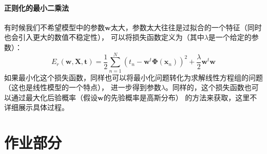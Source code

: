 \documentclass[a4paper,zihao=5,UTF8]{ctexart}
\newcommand{\mb}[1]{\mathbf{#1}}
\begin{document}
    \paragraph{正则化的最小二乘法}
    有时候我们不希望模型中的参数$\mb{w}$太大，参数太大往往是过拟合的一个特征（同时也会引入更大的数值不稳定性），
    可以将损失函数定义为（其中$\lambda$是一个给定的参数）：
    \begin{equation}
        E_r(\mb{w}, \mb{X}, \mb{t}) = \dfrac{1}{2}\sum_{n=1}^{N}(t_n - \mb{w}^t\mb{\Phi}(\mb{x}_n))^2 + \frac{\lambda}{2}\mb{w}^{t}\mb{w}
    \end{equation}
    如果最小化这个损失函数，同样也可以将最小化问题转化为求解线性方程组的问题（这也是线性模型的一个特点），
    进一步得到参数$\lambda$。同样的，这个损失函数也可以通过最大化后验概率（假设$\mb{w}$的先验概率是高斯分布）
    的方法来获取，这里不详细展示具体过程。
    \section{作业部分}
\end{document}
